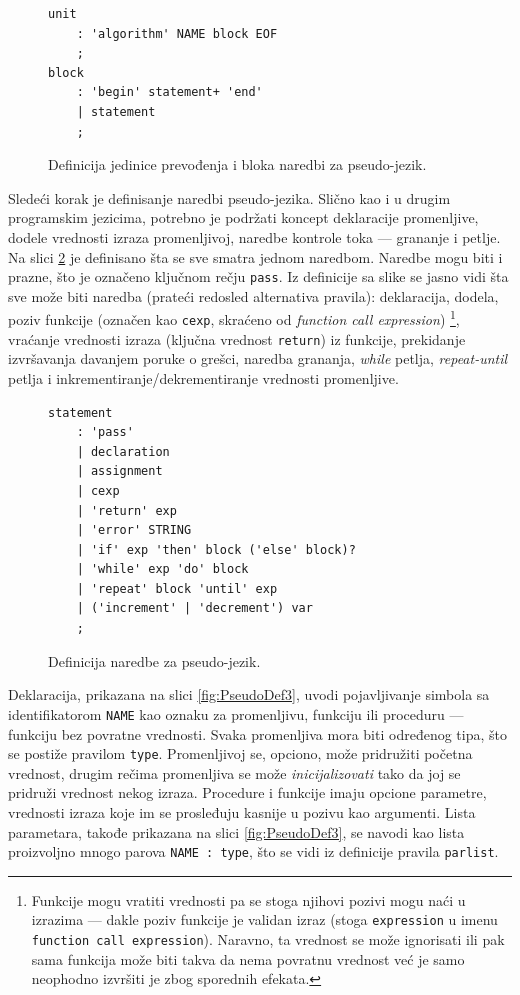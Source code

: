 \begin{figure}[h!]
\begin{lstlisting}[language={}]
unit
    : 'algorithm' NAME block EOF
    ;
block
    : 'begin' statement+ 'end'
    | statement
    ;
\end{lstlisting}
\caption{Definicija jedinice prevođenja i bloka naredbi za pseudo-jezik.}
\label{fig:PseudoDef1}
\end{figure}

Sledeći korak je definisanje naredbi pseudo-jezika. Slično kao i u drugim programskim jezicima, potrebno je podržati koncept deklaracije promenljive, dodele vrednosti izraza promenljivoj, naredbe kontrole toka --- grananje i petlje. Na slici \ref{fig:PseudoDef2} je definisano šta se sve smatra jednom naredbom. Naredbe mogu biti i prazne, što je označeno ključnom rečju \texttt{pass}. Iz definicije sa slike se jasno vidi šta sve može biti naredba (prateći redosled alternativa pravila): deklaracija, dodela, poziv funkcije (označen kao \texttt{cexp}, skraćeno od \emph{function call expression}) \footnote{Funkcije mogu vratiti vrednosti pa se stoga njihovi pozivi mogu naći u izrazima --- dakle poziv funkcije je validan izraz (stoga \texttt{expression} u imenu \texttt{function call expression}). Naravno, ta vrednost se može ignorisati ili pak sama funkcija može biti takva da nema povratnu vrednost već je samo neophodno izvršiti je zbog sporednih efekata.}, vraćanje vrednosti izraza (ključna vrednost \texttt{return}) iz funkcije, prekidanje izvršavanja davanjem poruke o grešci, naredba grananja, \emph{while} petlja, \emph{repeat-until} petlja i inkrementiranje/dekrementiranje vrednosti promenljive.
    
\begin{figure}[h!]
\begin{lstlisting}[language={}]
statement
    : 'pass'
    | declaration
    | assignment
    | cexp
    | 'return' exp
    | 'error' STRING
    | 'if' exp 'then' block ('else' block)? 
    | 'while' exp 'do' block 
    | 'repeat' block 'until' exp
    | ('increment' | 'decrement') var	
    ;
\end{lstlisting}
\caption{Definicija naredbe za pseudo-jezik.}
\label{fig:PseudoDef2}
\end{figure}

Deklaracija, prikazana na slici \ref{fig:PseudoDef3}, uvodi pojavljivanje simbola sa identifikatorom \texttt{NAME} kao oznaku za promenljivu, funkciju ili proceduru --- funkciju bez povratne vrednosti. Svaka promenljiva mora biti određenog tipa, što se postiže pravilom \texttt{type}. Promenljivoj se, opciono, može pridružiti početna vrednost, drugim rečima promenljiva se može \emph{inicijalizovati} tako da joj se pridruži vrednost nekog izraza. Procedure i funkcije imaju opcione parametre, vrednosti izraza koje im se prosleđuju kasnije u pozivu kao argumenti. Lista parametara, takođe prikazana na slici \ref{fig:PseudoDef3}, se navodi kao lista proizvoljno mnogo parova \texttt{NAME : type}, što se vidi iz definicije pravila \texttt{parlist}.

